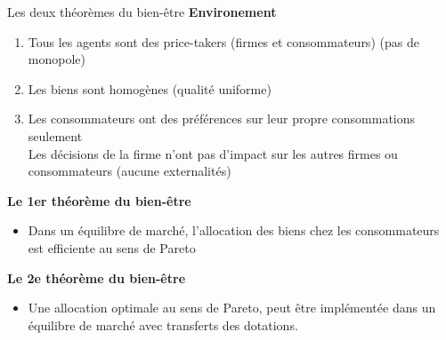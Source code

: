 \documentclass[handout]{beamer}
\newenvironment{iPar}[1]{\textbf{#1} \begin{itemize}}{\end{itemize}}
\newcommand{\mdp}{\medskip \pause}
\begin{document}
\begin{frame}{Les deux théorèmes du bien-être}
\textbf{Environement} \begin{enumerate} \item Tous les agents sont des price-takers (firmes et consommateurs) (pas de monopole) \item Les biens sont homogènes (qualité uniforme) \item Les consommateurs ont des préférences sur leur  propre consommations seulement\\  Les décisions de la firme n'ont pas d'impact sur les autres firmes ou consommateurs  (aucune externalités) 
\end{enumerate}

\begin{iPar}{Le 1er théorème du bien-être} \item Dans un équilibre de marché,
l'allocation des biens chez les consommateurs est efficiente au sens de Pareto 
\end{iPar}\mdp

\begin{iPar}{Le 2e théorème du bien-être} \item Une allocation optimale au sens de Pareto,
peut être implémentée dans un équilibre de marché avec transferts des dotations.  
\end{iPar}\mdp
\end{frame}
\end{document}

